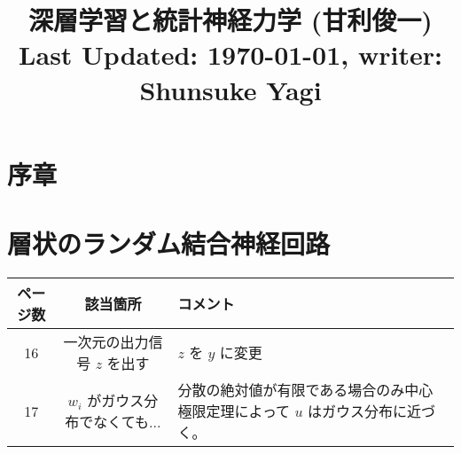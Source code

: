 \documentclass{jsarticle}
\title{深層学習と統計神経力学 (甘利俊一) \\[2ex] \large Last Updated: \today, \quad writer: Shunsuke Yagi}
\author{}
\date{}
\begin{document}
\setcounter{section}{-1}
\maketitle
\section{序章}
\section{層状のランダム結合神経回路}
\begin{table}[H]
  \centering
  \begin{tabular}{|c|c|p{10 cm}|}
      \hline
      ページ数 & 該当箇所 & コメント \\ \hline
      16 & 一次元の出力信号 $z$ を出す & $z$ を $y$ に変更 \\ \hline
      17 & $w_i$ がガウス分布でなくても... & 分散の絶対値が有限である場合のみ中心極限定理によって $u$ はガウス分布に近づく。 \\ \hline
  \end{tabular}
  \label{tab:mem}
\end{table}
\end{document}

